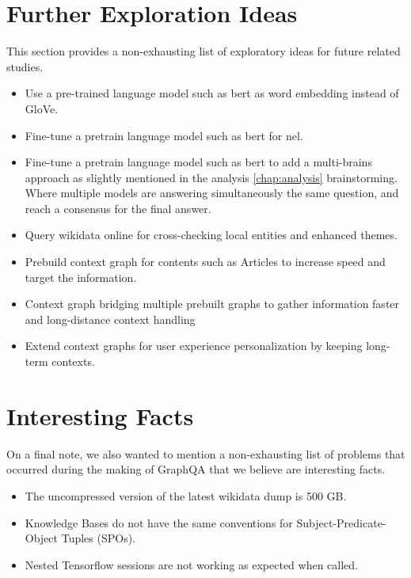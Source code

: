 \section{Further Exploration Ideas}
This section provides a non-exhausting list of exploratory ideas for future related studies.

\begin{itemize}
    \setlength\itemsep{0em}
    \item Use a pre-trained language model such as \gls{bert} as word embedding instead of GloVe.
    \item Fine-tune a pretrain language model such as \gls{bert} for \gls{nel}.
    \item Fine-tune a pretrain language model such as \gls{bert} to add a multi-brains approach as slightly mentioned in the analysis \ref{chap:analysis} brainstorming. Where multiple models are answering simultaneously the same question, and reach a consensus for the final answer.
    \item Query \gls{wikidata} online for cross-checking local entities and enhanced themes.
    \item Prebuild context graph for contents such as Articles to increase speed and target the information.
    \item Context graph bridging multiple prebuilt graphs to gather information faster and long-distance context handling
    \item Extend context graphs for user experience personalization by keeping long-term contexts.
\end{itemize}


\section{Interesting Facts}
On a final note, we also wanted to mention a non-exhausting list of problems that occurred during the making of GraphQA that we believe are interesting facts.

\begin{itemize}
    \setlength\itemsep{0em}
    \item The uncompressed version of the latest \gls{wikidata} dump is 500 GB.
    \item Knowledge Bases do not have the same conventions for Subject-Predicate-Object Tuples (SPOs).
    \item Nested Tensorflow sessions are not working as expected when called.
\end{itemize}


